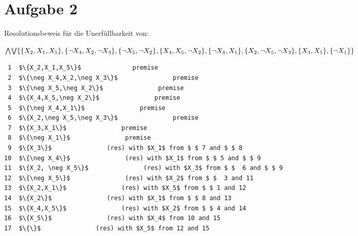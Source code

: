 \section*{Aufgabe 2}
Resolutionsbeweis für die Unerfüllbarkeit von:

$\bigwedge\!\bigvee \{\{X_2,X_1,X_5\}, \{\neg X_4,X_2,\neg X_3\}, \{\neg X_5,\neg X_2\}, \{X_4,X_5,\neg X_2\}, \{\neg X_4,X_1\}, \\
\{X_2,\neg X_5,\neg X_3\}, \{X_3,X_1\},\{\neg X_1\}\}$

\begin{lstlisting}
 1  $\{X_2,X_1,X_5\}$	           premise
 2  $\{\neg X_4,X_2,\neg X_3\}$               premise
 3  $\{\neg X_5,\neg X_2\}$               premise
 4  $\{X_4,X_5,\neg X_2\}$               premise
 5  $\{\neg X_4,X_1\}$               premise
 6  $\{X_2,\neg X_5,\neg X_3\}$               premise
 7  $\{X_3,X_1\}$               premise
 8  $\{\neg X_1\}$               premise
 9  $\{X_3\}$               (res) with $X_1$ from $ $ 7 and $ $ 8
10  $\{\neg X_4\}$               (res) with $X_1$ from $ $ 5 and $ $ 9
11  $\{X_2, \neg X_5\}$               (res) with $X_3$ from $ $  6 and $ $ 9
12  $\{\neg X_5\}$               (res) with $X_2$ from $ $  3 and 11
13  $\{X_2,X_1\}$               (res) with $X_5$ from $ $ 1 and 12
14  $\{X_2\}$               (res) with $X_1$ from $ $ 8 and 13
15  $\{X_4,X_5\}$               (res) with $X_2$ from $ $ 4 and 14
16  $\{X_5\}$               (res) with $X_4$ from 10 and 15
17  $\{\}$               (res) with $X_5$ from 12 and 15
\end{lstlisting}